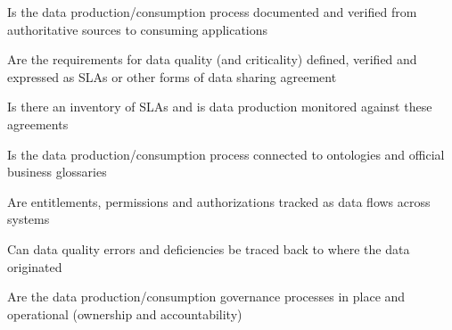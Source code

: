 \begin{core-questions}

  \item [\thesection.1] Is the data production/consumption process documented and verified from authoritative sources
                        to consuming applications
  \item [\thesection.2] Are the requirements for data quality (and criticality) defined, verified and expressed as SLAs
                        or other forms of data sharing agreement
  \item [\thesection.3] Is there an inventory of SLAs and is data production monitored against these agreements
  \item [\thesection.4] Is the data production/consumption process connected to ontologies and
                        official business glossaries
  \item [\thesection.5] Are entitlements, permissions and authorizations tracked as data flows across systems
  \item [\thesection.6] Can data quality errors and deficiencies be traced back to where the data originated
  \item [\thesection.7] Are the data production/consumption governance processes in place and operational
                        (ownership and accountability)

\end{core-questions}

